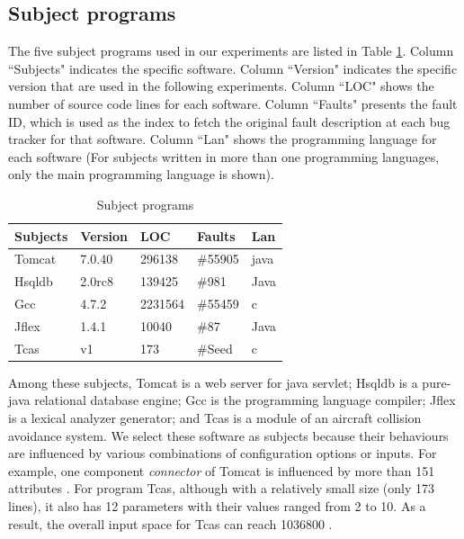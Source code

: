 \documentclass{sig-alternate}
\begin{document}
\subsection{Subject programs}
The five subject programs used in our experiments are listed in Table \ref{subject}. Column ``Subjects" indicates the specific software. Column ``Version" indicates the specific version that are used in the following experiments. Column ``LOC" shows the number of source code lines for each software. Column ``Faults" presents the fault ID, which is used as the index to fetch the original fault description at each bug tracker for that software. Column ``Lan" shows the programming language for each software (For subjects written in more than one programming languages, only the main programming language is shown).

\begin{table}[ht]
\caption{Subject programs}
\label{subject}
\center
\begin{tabular}{l|l|l|l|l}
\hline
Subjects & Version & LOC & Faults &  Lan \\
\hline
Tomcat   &   7.0.40      & 296138    &   \#55905   & java  \\
Hsqldb   &   2.0rc8  &   139425   &    \#981     & Java \\
Gcc      &   4.7.2      &  2231564   & \#55459       &  c\\
Jflex    &    1.4.1     & 10040    &    \#87    & Java \\
Tcas     & v1     &   173  &    \#Seed  & c \\ \hline
\end{tabular}

\end{table}

Among these subjects, Tomcat is a web server for java servlet; Hsqldb is a pure-java relational database engine; Gcc is the programming language compiler; Jflex is a lexical analyzer generator; and Tcas is a module of an aircraft collision avoidance system. We select these software as subjects because their behaviours are influenced by various combinations of configuration options or inputs. For example, one component \emph{connector} of Tomcat is influenced by more than 151 attributes \cite{tomcatconnector}. For program Tcas, although with a relatively small size (only 173 lines), it also has 12 parameters with their values ranged from 2 to 10. As a result, the overall input space for Tcas can reach 1036800 \cite{shakya2012isolating,kuhn2006pseudo}.
\end{document}
